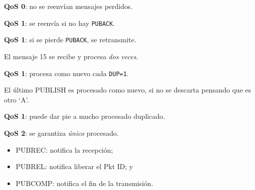 \documentclass[xcolor={x11names}]{beamer}
\begin{document}
\begin{frame}{\secname}
    \textbf{QoS 0}: no se reenvían mensajes perdidos.
    \begin{figure}
        
    \end{figure}
\end{frame}



\begin{frame}{\secname}
    \textbf{QoS 1}: se reenvía si no hay \texttt{PUBACK}.
    \begin{figure}
        
    \end{figure}
\end{frame}



\begin{frame}{\secname}
    \textbf{QoS 1}: si se pierde \texttt{PUBACK}, se retransmite.
    \begin{figure}
        
    \end{figure}
    El mensaje 15 se recibe y procesa \emph{dos veces}.
\end{frame}



\begin{frame}{\secname}
    \textbf{QoS 1}: procesa como nuevo cada \texttt{DUP=1}.
    \begin{figure}
        
    \end{figure}
    El último PUBLISH es procesado como
    nuevo, si no se descarta pensando
    que es otro `A'.
\end{frame}



\begin{frame}{\secname}
    \textbf{QoS 1}: puede dar pie a mucho procesado duplicado.
    \begin{figure}
        \resizebox{.9\textwidth}{!}{
            
        }
    \end{figure}
\end{frame}






\begin{frame}{\secname}
    \textbf{QoS 2}: se garantiza \emph{único} procesado.

    \begin{figure}
        \resizebox{.7\textwidth}{!}{
            
        }
    \end{figure}

    \begin{itemize}
        \item PUBREC: notifica la recepción;
        \item PUBREL: notifica liberar el Pkt ID; y
        \item PUBCOMP: notifica el fin de la transmisión.
    \end{itemize}
\end{frame}
\end{document}
